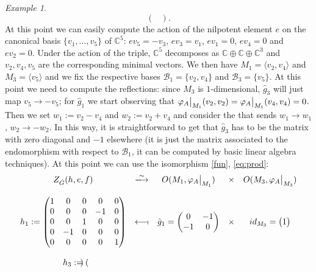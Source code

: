 \documentclass[a4paper,10pt]{amsart}
\newcommand\restr[2]{{%
  \left.\kern-\nulldelimiterspace %
  #1 %
  \vphantom{\big|} %
  \right|_{#2} %
  }}
\newcommand{\testleftlong}{\longleftarrow\!\shortmid}
\numberwithin{equation}{section}
\theoremstyle{remark}
\theoremstyle{remark}
\newtheorem{example}[theorem]{Example}
\begin{document}
\begin{example}
$$\begin{pmatrix}
    \end{pmatrix}.$$ At this point we can easily compute the action of the nilpotent element $e$ on the canonical basis $\{v_1,\dots,v_5\}$ of $\mathbb{C}^5$: $ev_5=-v_3$, $ev_3=v_1$, $ev_1=0$, $ev_4=0$ and $ev_2=0$. Under the action of the triple, $\mathbb{C}^5$ decomposes as $\mathbb{C}\oplus\mathbb{C}\oplus\mathbb{C}^3$ and $v_2, v_4, v_5$ are the corresponding minimal vectors. We then have $M_1=\langle v_2, v_4\rangle$ and $M_3=\langle v_5\rangle$ and we fix the respective bases $\mathcal{B}_1=\{v_2,v_4\}$ and $\mathcal{B}_3=\{v_5\}$. At this point we need to compute the reflections: since $M_3$ is $1$-dimensional, $\hat{g}_3$ will just map $v_5\to -v_5$; for $\hat{g}_1$ we start observing that $\restr{\varphi_A}{M_1}(v_2,v_2)=\restr{\varphi_A}{M_1}(v_4,v_4)=0$. Then we set $w_1:=v_2-v_4$ and $w_2:=v_2+v_4$ and consider the  that sends $w_1\to w_1$, $w_2\to -w_2$. In this way, it is straightforward to get that $\hat{g}_3$ has to be the matrix with zero diagonal and $-1$ elsewhere (it is just the matrix associated to the endomorphism with respect to $\mathcal{B}_1$, it can be computed by basic linear algebra techniques). At this point we can use the isomorphism \eqref{fun}, \eqref{eq:prod}: \vspace{0.5cm}$$\begin{matrix}
        Z_{\hat{G}}(h,e,f) & \xlongrightarrow{\sim} & O(M_1,\restr{\varphi_A}{M_1}) & \times & O(M_3,\restr{\varphi_A}{M_3})\\
        & & & &\\
        h_1:=\begin{pmatrix}
        1 & 0 & 0 & 0 & 0\\
        0 & 0 & 0 &-1 & 0\\
        0 & 0 & 1 & 0 & 0\\
        0 & -1 & 0 & 0 & 0\\
        0 & 0 & 0 & 0 & 1\\
        \end{pmatrix} & \testleftlong & \hat{g}_1=\begin{pmatrix}
            0 & -1\\
            -1 & 0
        \end{pmatrix} & \times & id_{M_3}=\begin{pmatrix}
            1
        \end{pmatrix}\\
        & & & &\\
                h_3:=\begin{pmatrix}

\end{pmatrix}
\end{matrix}$$
\end{example}
\end{document}
